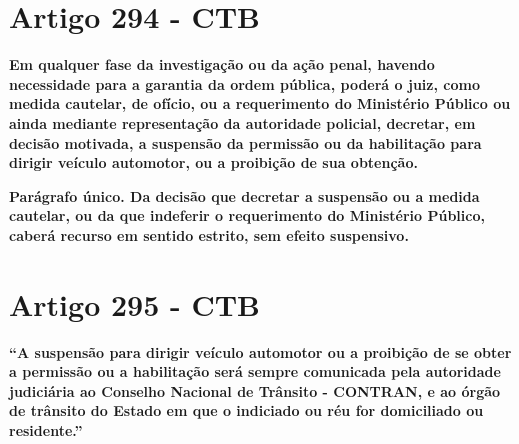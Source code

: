 \documentclass[
  letterpaper,
  DIV=11,
  numbers=noendperiod]{scrreport}
\begin{document}
\hypertarget{artigo-294---ctb}{%
\section{\texorpdfstring{\textbf{Artigo 294 -
CTB}}{Artigo 294 - CTB}}\label{artigo-294---ctb}}

\begin{tcolorbox}[enhanced jigsaw, titlerule=0mm, colframe=quarto-callout-important-color-frame, opacityback=0, breakable, colbacktitle=quarto-callout-important-color!10!white, left=2mm, bottomtitle=1mm, toprule=.15mm, rightrule=.15mm, arc=.35mm, leftrule=.75mm, bottomrule=.15mm, opacitybacktitle=0.6, toptitle=1mm, title=\textcolor{quarto-callout-important-color}{\faExclamation}\hspace{0.5em}{Important}, colback=white, coltitle=black]

\textbf{Em qualquer fase da investigação ou da ação penal, havendo
necessidade para a garantia da ordem pública, poderá o juiz, como medida
cautelar, de ofício, ou a requerimento do Ministério Público ou ainda
mediante representação da autoridade policial, decretar, em decisão
motivada, a suspensão da permissão ou da habilitação para dirigir
veículo automotor, ou a proibição de sua obtenção.}

\textbf{Parágrafo único. Da decisão que decretar a suspensão ou a medida
cautelar, ou da que indeferir o requerimento do Ministério Público,
caberá recurso em sentido estrito, sem efeito suspensivo.}

\end{tcolorbox}

\hypertarget{artigo-295---ctb}{%
\section{\texorpdfstring{\textbf{Artigo 295 -
CTB}}{Artigo 295 - CTB}}\label{artigo-295---ctb}}

\begin{tcolorbox}[enhanced jigsaw, titlerule=0mm, colframe=quarto-callout-important-color-frame, opacityback=0, breakable, colbacktitle=quarto-callout-important-color!10!white, left=2mm, bottomtitle=1mm, toprule=.15mm, rightrule=.15mm, arc=.35mm, leftrule=.75mm, bottomrule=.15mm, opacitybacktitle=0.6, toptitle=1mm, title=\textcolor{quarto-callout-important-color}{\faExclamation}\hspace{0.5em}{Important}, colback=white, coltitle=black]

\textbf{``A suspensão para dirigir veículo automotor ou a proibição de
se obter a permissão ou a habilitação será sempre comunicada pela
autoridade judiciária ao Conselho Nacional de Trânsito - CONTRAN, e ao
órgão de trânsito do Estado em que o indiciado ou réu for domiciliado ou
residente.''}

\end{tcolorbox}
\end{document}
